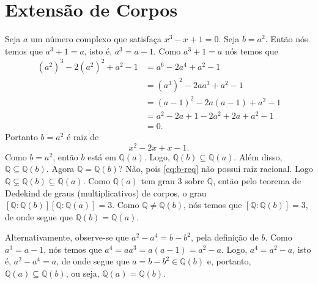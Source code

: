 \documentclass{article}
\begin{document}
\section{Extensão de Corpos}

Seja $a$ um número complexo que satisfaça $x^3 - x + 1 = 0$. Seja $b =
a^2$.  Então nós temos que $a^3 + 1 = a$, isto é, $a^3 = a - 1$.  Como
$a^3 + 1 = a$ nós temos que
\begin{align*}
  (a^2)^3 - 2(a^2)^2 + a^2 - 1 &= a^6 -2a^4 + a^2 -1\\
  &= (a^3)^2 - 2a a^3 + a^2 - 1\\
  &= (a-1)^2 - 2a(a-1) + a^2 -1\\
  &= a^2 -2a + 1 - 2a^2 + 2a + a^2 -1\\
  &= 0.
\end{align*}
Portanto $b = a^2$ é raiz de
\begin{equation}
  \label{eq:b-req}
  x^2 - 2x + x -1.
\end{equation}
Como $b = a^2$, então $b$ está em $\mathbb Q(a)$. Logo, $\mathbb Q(b)
\subseteq \mathbb Q(a)$. Além disso, $\mathbb Q \subseteq \mathbb
Q(b)$. Agora $\mathbb Q = \mathbb Q(b)$? Não, pois \eqref{eq:b-req} não
possui raiz racional. Logo $\mathbb Q \subsetneq \mathbb Q(b) \subseteq
\mathbb Q(a)$. Como $\mathbb Q(a)$ tem grau $3$ sobre $\mathbb Q$, então
pelo teorema de Dedekind de graus (multiplicativos) de corpos, o grau
$[\mathbb Q:\mathbb Q(b)][\mathbb Q:\mathbb Q(a)] = 3$.  Como $\mathbb Q \ne
\mathbb Q(b)$, nós temos que $[\mathbb Q:\mathbb Q(b)] = 3$, de onde segue
que $\mathbb Q(b) = \mathbb Q(a)$.

Alternativamente, observe-se que $a^2 - a^4 = b - b^2$, pela definição
de $b$.  Como $a^3 = a - 1$, nós temos que $a^4 = a a^3 = a(a-1) = a^2
-a$.  Logo, $a^4 = a^2 - a$, isto é, $a^2 - a^4 = a$, de onde segue que
$a = b - b^2 \in \mathbb Q(b)$ e, portanto, $\mathbb Q(a) \subseteq
\mathbb Q(b)$, ou seja, $\mathbb Q(a) = \mathbb Q(b)$.
\end{document}
